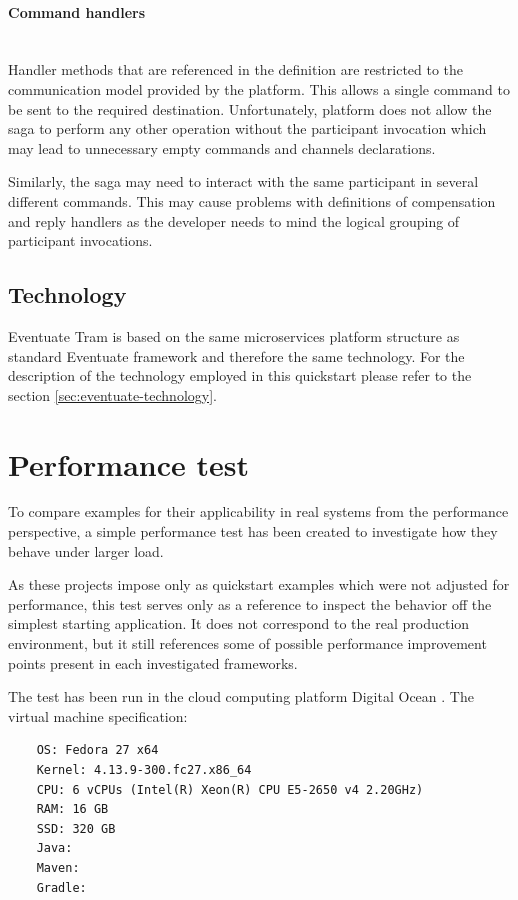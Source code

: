 \documentclass[oneside,
  digital, %
  table,   %
  nolof,     %
  nolot,     %
]{fithesis3}
\newcommand{\newlinepar}[1]{\paragraph{#1}\needspace{4\baselineskip}\mbox{}\\}
\begin{document}
\newlinepar{Command handlers}

Handler methods that are referenced in the definition are restricted to the communication model provided by the platform. This allows a single command to be sent to the required destination. Unfortunately, platform does not allow the saga to perform any other operation without the participant invocation which may lead to unnecessary empty commands and channels declarations. 

Similarly, the saga may need to interact with the same participant in several different commands. This may cause problems with definitions of compensation and reply handlers as the developer needs to mind the logical grouping of participant invocations.

\subsection{Technology}

Eventuate Tram is based on the same microservices platform structure as standard Eventuate framework and therefore the same technology. For the description of the technology employed in this quickstart please refer to the section \ref{sec:eventuate-technology}.

\section{Performance test}

To compare examples for their applicability in real systems from the performance perspective, a simple performance test has been created to investigate how they behave under larger load.

As these projects impose only as quickstart examples which were not adjusted for performance, this test serves only as a reference to inspect the behavior off the simplest starting application. It does not correspond to the real production environment, but it still references some of possible performance improvement points present in each investigated frameworks.

The test has been run in the cloud computing platform Digital Ocean \cite{digital-ocean}. The virtual machine specification:

\begin{verbatim}
    OS: Fedora 27 x64
    Kernel: 4.13.9-300.fc27.x86_64
    CPU: 6 vCPUs (Intel(R) Xeon(R) CPU E5-2650 v4 2.20GHz)
    RAM: 16 GB
    SSD: 320 GB
    Java: 
    Maven: 
    Gradle: 
\end{verbatim}
\end{document}
